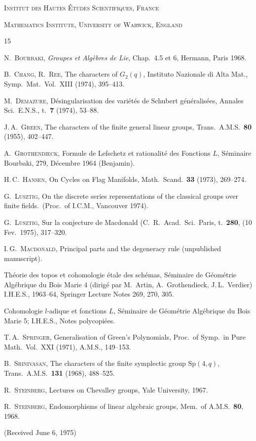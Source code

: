 \documentclass{amsart}
\theoremstyle{plain}
\theoremstyle{remark}
\begin{document}
\bigskip

\noindent \textsc{Institut des Hautes \'Etudes Scientifiques, France}

\noindent \textsc{Mathematics Institute, University of Warwick, England}

\begin{thebibliography}{15}

 \textsc{N.\ Bourbaki}, \textit{Groupes et Alg\`ebres de Lie}, Chap.\ 4.5 et 6, Hermann, Paris 1968.

 \textsc{B.\ Chang, R.\ Ree}, The characters of $G_2(q)$, Instituto Nazionale di Alta Mat., Symp.\ Mat.\ Vol.\ XIII (1974), 395--413.

 \textsc{M.\ Demazure}, D\'esingularisation des vari\'et\'es de Schubert g\'en\'eralis\'ees, Annales Sci.\ E.N.S., t.\ \textbf{7} (1974), 53--88.

 \textsc{J.\,A.\ Green}, The characters of the finite general linear groups, Trans.\ A.M.S.\ \textbf{80} (1955), 402--447.

 \textsc{A.\ Grothendieck}, Formule de Lefschetz et rationalit\'e des Fonctions $L$, S\'eminaire Bourbaki, 279, D\'ecembre 1964 (Benjamin).

 \textsc{H.\,C.\ Hansen}, On Cycles on Flag Manifolds, Math.\ Scand.\ \textbf{33} (1973), 269--274.

 \textsc{G.\ Lusztig}, On the discrete series representations of the classical groups over finite fields.\ (Proc.\ of I.C.M., Vancouver 1974).

 \textsc{G.\ Lusztig}, Sur la conjecture de Macdonald (C.\ R.\ Acad.\ Sci.\ Paris, t.\ \textbf{280}, (10 Fev.\ 1975), 317--320.

 \textsc{I.\,G.\ Macdonald}, Principal parts and the degeneracy rule (unpublished manuscript).

 Th\'eorie des topos et cohomologie \'etale des sch\'emas, S\'eminaire de G\'eom\'etrie Alg\'ebrique du Bois Marie 4 (dirig\'e par M.\ Artin, A.\ Grothendieck, J.\,L.\ Verdier) I.H.E.S., 1963--64, Springer Lecture Notes 269, 270, 305.

 Cohomologie $l$-adique et fonctions $L$, S\'eminaire de G\'eom\'etrie Alg\'ebrique du Bois Marie 5; I.H.E.S., Notes polycopi\'ees.

 \textsc{T.\,A.\ Springer}, Generalisation of Green's Polynomials, Proc.\ of Symp.\ in Pure Math.\ Vol.\ XXI (1971), A.M.S., 149--153.

 \textsc{B.\ Srinivasan}, The characters of the finite symplectic group $\mathrm{Sp}(4,q)$, Trans.\ A.M.S.\ \textbf{131} (1968), 488--525.

 \textsc{R.\ Steinberg}, Lectures on Chevalley groups, Yale University, 1967.

 \textsc{R.\ Steinberg}, Endomorphisms of linear algebraic groups, Mem.\ of A.M.S.\ \textbf{80}, 1968.

\end{thebibliography}

\begin{center}
(Received June 6, 1975)
\end{center}
\end{document}
